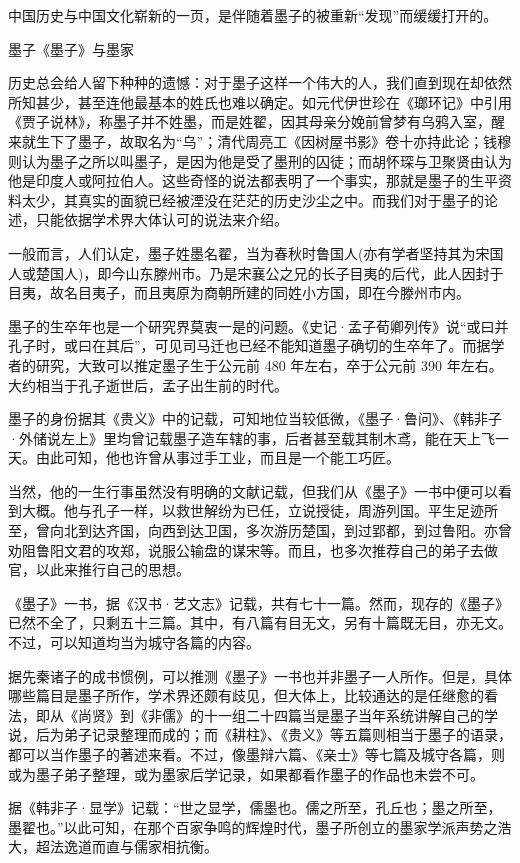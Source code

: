 \documentclass[12pt,UTF8]{ctexbook}
\begin{document}
中国历史与中国文化崭新的一页，是伴随着墨子的被重新“发现”而缓缓打开的。

墨子《墨子》与墨家

历史总会给人留下种种的遗憾：对于墨子这样一个伟大的人，我们直到现在却依然所知甚少，甚至连他最基本的姓氏也难以确定。如元代伊世珍在《瑯环记》中引用《贾子说林》，称墨子并不姓墨，而是姓翟，因其母亲分娩前曾梦有乌鸦入室，醒来就生下了墨子，故取名为“乌”；清代周亮工《因树屋书影》卷十亦持此论；钱穆则认为墨子之所以叫墨子，是因为他是受了墨刑的囚徒；而胡怀琛与卫聚贤由认为他是印度人或阿拉伯人。这些奇怪的说法都表明了一个事实，那就是墨子的生平资料太少，其真实的面貌已经被湮没在茫茫的历史沙尘之中。而我们对于墨子的论述，只能依据学术界大体认可的说法来介绍。

一般而言，人们认定，墨子姓墨名翟，当为春秋时鲁国人(亦有学者坚持其为宋国人或楚国人)，即今山东滕州市。乃是宋襄公之兄的长子目夷的后代，此人因封于目夷，故名目夷子，而且夷原为商朝所建的同姓小方国，即在今滕州市内。

墨子的生卒年也是一个研究界莫衷一是的问题。《史记·孟子荀卿列传》说“或曰并孔子时，或曰在其后”，可见司马迁也已经不能知道墨子确切的生卒年了。而据学者的研究，大致可以推定墨子生于公元前 480 年左右，卒于公元前 390 年左右。大约相当于孔子逝世后，孟子出生前的时代。

墨子的身份据其《贵义》中的记载，可知地位当较低微，《墨子·鲁问》、《韩非子·外储说左上》里均曾记载墨子造车辖的事，后者甚至载其制木鸢，能在天上飞一天。由此可知，他也许曾从事过手工业，而且是一个能工巧匠。

当然，他的一生行事虽然没有明确的文献记载，但我们从《墨子》一书中便可以看到大概。他与孔子一样，以救世解纷为已任，立说授徒，周游列国。平生足迹所至，曾向北到达齐国，向西到达卫国，多次游历楚国，到过郢都，到过鲁阳。亦曾劝阻鲁阳文君的攻郑，说服公输盘的谋宋等。而且，也多次推荐自己的弟子去做官，以此来推行自己的思想。

《墨子》一书，据《汉书·艺文志》记载，共有七十一篇。然而，现存的《墨子》已然不全了，只剩五十三篇。其中，有八篇有目无文，另有十篇既无目，亦无文。不过，可以知道均当为城守各篇的内容。

据先秦诸子的成书惯例，可以推测《墨子》一书也并非墨子一人所作。但是，具体哪些篇目是墨子所作，学术界还颇有歧见，但大体上，比较通达的是任继愈的看法，即从《尚贤》到《非儒》的十一组二十四篇当是墨子当年系统讲解自己的学说，后为弟子记录整理而成的；而《耕柱》、《贵义》等五篇则相当于墨子的语录，都可以当作墨子的著述来看。不过，像墨辩六篇、《亲士》等七篇及城守各篇，则或为墨子弟子整理，或为墨家后学记录，如果都看作墨子的作品也未尝不可。

据《韩非子·显学》记载：“世之显学，儒墨也。儒之所至，孔丘也；墨之所至，墨翟也。”以此可知，在那个百家争鸣的辉煌时代，墨子所创立的墨家学派声势之浩大，超法逸道而直与儒家相抗衡。
\end{document}
